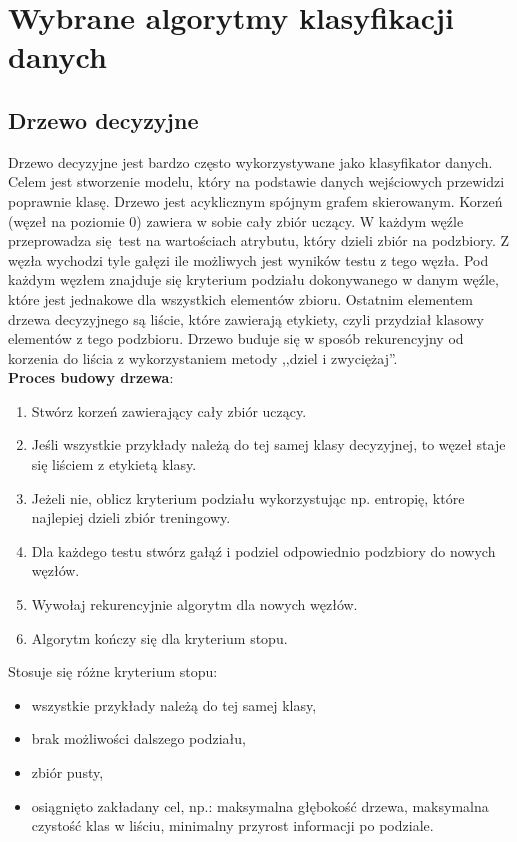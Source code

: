 \section{Wybrane algorytmy klasyfikacji danych}
\subsection{Drzewo decyzyjne}
Drzewo decyzyjne jest bardzo często wykorzystywane jako klasyfikator danych. Celem jest stworzenie modelu, który na podstawie danych wejściowych przewidzi poprawnie klasę. Drzewo jest acyklicznym spójnym grafem skierowanym. Korzeń (węzeł na poziomie 0) zawiera w sobie cały zbiór uczący. W każdym węźle przeprowadza się test na wartościach atrybutu, który dzieli zbiór na podzbiory. Z węzła wychodzi tyle gałęzi ile możliwych jest wyników testu z tego węzła. Pod każdym węzłem znajduje się kryterium podziału dokonywanego w danym węźle, które jest jednakowe dla wszystkich elementów zbioru. Ostatnim elementem drzewa decyzyjnego są liście, które zawierają etykiety, czyli przydział klasowy elementów z tego podzbioru. Drzewo buduje się w sposób rekurencyjny od korzenia do liścia z wykorzystaniem metody ,,dziel i zwyciężaj''.\\
\textbf{Proces budowy drzewa}:
\begin{enumerate}
	\item Stwórz korzeń zawierający cały zbiór uczący.
	\item Jeśli wszystkie przykłady należą do tej samej klasy decyzyjnej, to węzeł staje się liściem z etykietą klasy.
	\item Jeżeli nie, oblicz kryterium podziału wykorzystując np. entropię, które najlepiej dzieli zbiór treningowy.
	\item Dla każdego testu stwórz gałąź i podziel odpowiednio podzbiory do nowych węzłów.
	\item Wywołaj rekurencyjnie algorytm dla nowych węzłów.
	\item Algorytm kończy się dla kryterium stopu.
\end{enumerate}
Stosuje się różne kryterium stopu:
\begin{itemize}
	\item wszystkie przykłady należą do tej samej klasy,
	\item brak możliwości dalszego podziału,
	\item zbiór pusty,
	\item osiągnięto zakładany cel, np.: maksymalna głębokość drzewa, maksymalna czystość klas w liściu, minimalny przyrost informacji po podziale.
\end{itemize}
